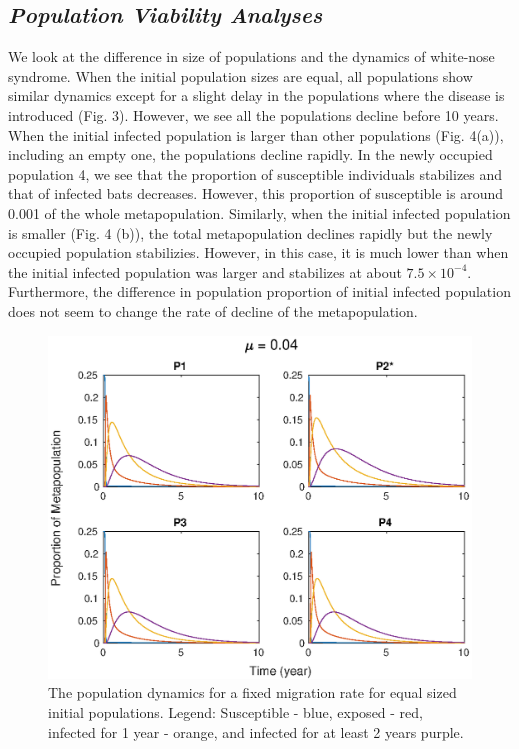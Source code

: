 \documentclass[12pt]{article}
\begin{document}
\subsection*{\sc\textit{Population Viability Analyses}}

We look at the difference in size of populations and the dynamics of white-nose syndrome. When the initial population sizes are equal, all populations show similar dynamics except for a slight delay in the populations where the disease is introduced (Fig. 3). However, we see all the populations decline before 10 years. When the initial infected population is larger than other populations (Fig. 4(a)), including an empty one, the populations decline rapidly. In the newly occupied population 4, we see that the proportion of susceptible individuals stabilizes and that of infected bats decreases. However, this proportion of susceptible is around 0.001 of the whole metapopulation. Similarly, when the initial infected population is smaller (Fig. 4 (b)), the total metapopulation declines rapidly but the newly occupied population stabilizies. However, in this case, it is much lower than when the initial infected population was larger and stabilizes at about $7.5 \times 10^{-4}$. Furthermore, the difference in population proportion of initial infected population does not seem to change the rate of decline of the metapopulation. 

\begin{figure}
    \centering
    \includegraphics{mu_5.eps}
    \caption{The population dynamics for a fixed migration rate for equal sized initial populations.  Legend: Susceptible - blue, exposed - red, infected for 1 year - orange, and infected for at least 2 years purple.}
    \label{fig:my_label}
\end{figure}
\end{document}

